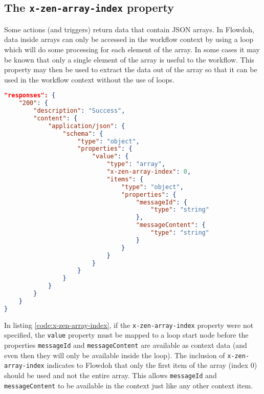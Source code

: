 \subsection{The \texttt{x-zen-array-index} property}
Some actions (and triggers) return data that contain JSON arrays. In Flowdoh, data inside arrays can only be accessed in the workflow context by using a loop which will do some processing for each element of the array. In some cases it may be known that only a single element of the array is useful to the workflow. This property may then be used to extract the data out of the array so that it can be used in the workflow context without the use of loops.
\begin{lstlisting}[caption={\texttt{x-zen-array-index} usage},label={code:x-zen-array-index},language=json]
"responses": {
    "200": {
        "description": "Success",
        "content": {
            "application/json": {
                "schema": {
                    "type": "object",
                    "properties": {
                        "value": {
                            "type": "array",
                            "x-zen-array-index": 0,
                            "items": {
                                "type": "object",
                                "properties": {
                                    "messageId": {
                                        "type": "string"
                                    },
                                    "messageContent": {
                                        "type": "string"
                                    }
                                }
                            }
                        }
                    }
                }
            }
        }
    }
}
\end{lstlisting}
In listing \ref{code:x-zen-array-index}, if the \texttt{x-zen-array-index} property were not specified, the \texttt{value} property must be mapped to a loop start node before the properties \texttt{messageId} and \texttt{messageContent} are available as context data (and even then they will only be available inside the loop). The inclusion of \texttt{x-zen-array-index} indicates to Flowdoh that only the first item of the array (index 0) should be used and not the entire array. This allows \texttt{messageId} and \texttt{messageContent} to be available in the context just like any other context item.
